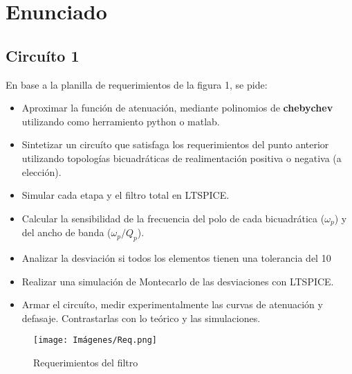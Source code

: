 \section{Enunciado}
    \subsection{Circuíto 1}
    
    En base a la planilla de requerimientos de la figura 1, se pide:\\
    
    \begin{itemize}
        \item Aproximar la función de atenuación, mediante polinomios de \textbf{chebychev} utilizando como herramiento python o matlab.\\
        \item Sintetizar un circuíto que satisfaga los requerimientos del punto anterior utilizando topologías bicuadráticas de realimentación positiva o negativa (a elección).\\
        \item Simular cada etapa y el filtro total en LTSPICE.\\
        \item Calcular la sensibilidad de la frecuencia del polo de cada bicuadrática ($\omega_p$) y del ancho de banda ($\omega_p/Q_p$).\\
        \item Analizar la desviación si todos los elementos tienen una tolerancia del 10%
        \item Realizar una simulación de Montecarlo de las desviaciones con LTSPICE.\\
        \item Armar el circuíto, medir experimentalmente las curvas de atenuación y defasaje. Contrastarlas con lo teórico y las simulaciones.
    \end{itemize}
    
    \begin{figure}[ht]
        \centering
        \texttt{[image: Imágenes/Req.png]}
        \caption{Requerimientos del filtro}
    \end{figure}

    \newpage
